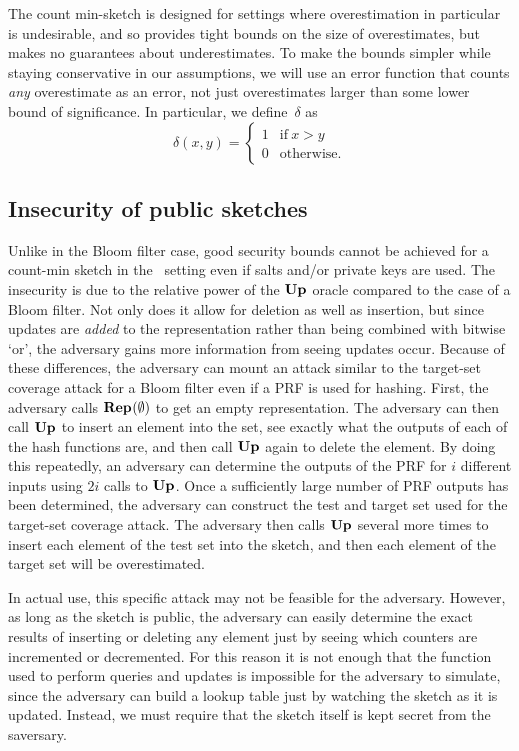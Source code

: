 
The count min-sketch is designed for settings where overestimation in particular
is undesirable, and so provides tight bounds on the size of overestimates, but
makes no guarantees about underestimates. To make the bounds simpler while
staying conservative in our assumptions, we will use an error function that
counts \emph{any} overestimate as an error, not just overestimates larger than
some lower bound of significance. In particular, we define~$\delta$ as
\begin{equation}
  \delta(x, y) =
  \begin{cases}
    1 & \text{if}\ x > y \\
    0 & \text{otherwise.}
  \end{cases}
\end{equation}

\subsection{Insecurity of public sketches}

Unlike in the Bloom filter case, good security bounds cannot be achieved for a
count-min sketch in the \errep\ setting even if salts and/or private keys are
used. The insecurity is due to the relative power of the $\textup{\textbf{Up}}\hspace{0.5pt}$ oracle compared
to the case of a Bloom filter. Not only does it allow for deletion as well as
insertion, but since updates are \emph{added} to the representation rather than
being combined with bitwise `or', the adversary gains more information from
seeing updates occur. Because of these differences, the adversary can mount
an attack similar to the target-set coverage attack for a Bloom filter even if a
PRF is used for
hashing. First, the adversary calls $\textup{\textbf{Rep}}\hspace{0.5pt}(\emptyset)$ to get an empty
representation. The adversary can then call $\textup{\textbf{Up}}\hspace{0.5pt}$ to insert an element into the
set, see exactly what the outputs of each of the hash functions are, and then
call $\textup{\textbf{Up}}\hspace{0.5pt}$ again to delete the element. By doing this repeatedly, an adversary
can determine the outputs of the PRF for $i$ different inputs using $2i$ calls
to $\textup{\textbf{Up}}\hspace{0.5pt}$. Once a sufficiently large number of PRF outputs has been determined,
the adversary can construct the test and target set used for the target-set
coverage attack. The adversary then calls $\textup{\textbf{Up}}\hspace{0.5pt}$ several more times to insert
each element of the test set into the sketch, and then
each element of the target set will be overestimated.

In actual use, this specific attack may not be feasible for the adversary.
However, as long as the sketch is public, the adversary can easily determine the
exact results of inserting or deleting any element just by seeing which counters
are incremented or decremented. For this reason it is not enough that the
function used to perform queries and updates is impossible for the adversary to
simulate, since the adversary can build a lookup table just by watching the
sketch as it is updated. Instead, we must require that the sketch itself is kept
secret from the saversary.

